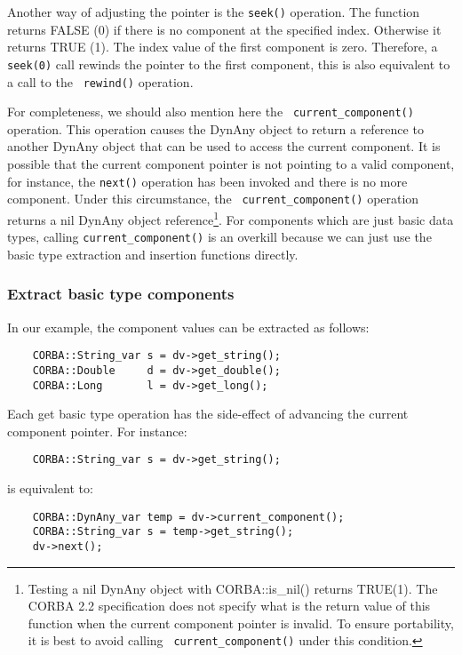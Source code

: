 \documentclass[11pt,twoside,onecolumn]{book}
\begin{document}
Another way of adjusting the pointer is the {\tt seek()} operation. The
function returns FALSE (0) if there is no component at the specified
index. Otherwise it returns TRUE (1). The index value of the first
component is zero. Therefore, a {\tt seek(0)} call rewinds the pointer to
the first component, this is also equivalent to a call to the {\tt
rewind()} operation.

For completeness, we should also mention here the {\tt
current\_component()} operation. This operation causes the DynAny object to
return a reference to another DynAny object that can be used to access the
current component. It is possible that the current component pointer is not
pointing to a valid component, for instance, the {\tt next()} operation has
been invoked and there is no more component. Under this circumstance, the {\tt
current\_component()} operation returns a nil DynAny object
reference\footnote{Testing a nil DynAny object with CORBA::is\_nil()
returns TRUE(1). The CORBA 2.2 specification does not specify what is the
return value of this function when the current component pointer is
invalid. To ensure portability, it is best to avoid calling {\tt
current\_component()} under this condition.}. For components which are just
basic data types, calling {\tt current\_component()} is an overkill because
we can just use the basic type extraction and insertion functions directly.

\subsubsection{Extract basic type components}

In our example, the component values can be extracted as follows:

{\small
\begin{verbatim}
    CORBA::String_var s = dv->get_string();
    CORBA::Double     d = dv->get_double();
    CORBA::Long       l = dv->get_long();
\end{verbatim}
}

Each get basic type operation has the side-effect of advancing the current
component pointer. For instance:

{\small
\begin{verbatim}
    CORBA::String_var s = dv->get_string();
\end{verbatim}
}

is equivalent to:

{\small
\begin{verbatim}
    CORBA::DynAny_var temp = dv->current_component();
    CORBA::String_var s = temp->get_string();
    dv->next();
\end{verbatim}
}
\end{document}
